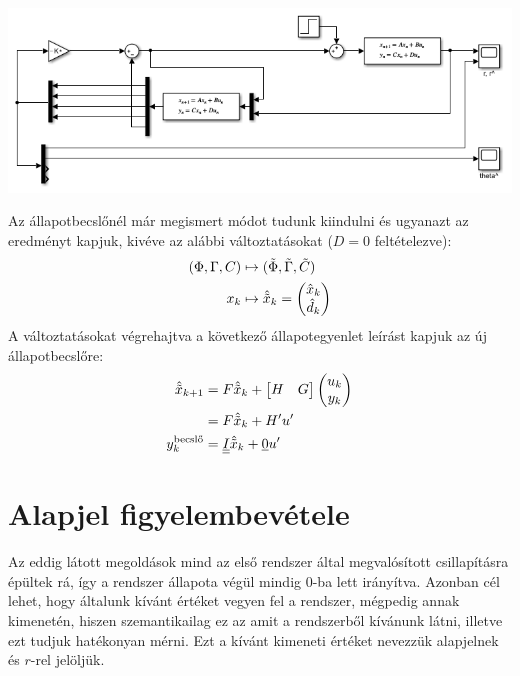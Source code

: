 \documentclass{article}
\begin{document}
        \begin{center}
            \includegraphics[width=\linewidth]{asset/d^.png}
        \end{center}

        Az állapotbecslőnél már megismert módot tudunk kiindulni és ugyanazt az eredményt kapjuk, kivéve az alábbi változtatásokat ($D = 0$ feltételezve):
        \begin{align}
            (\Phi, \Gamma, C) & \mapsto (\tilde{\Phi}, \tilde{\Gamma}, \tilde{C}) \\
            x_k & \mapsto \hat{\tilde{x}}_k = 
            \begin{pmatrix}
                \hat{x}_k \\
                \hat{d}_k
            \end{pmatrix}
        \end{align}
        A változtatásokat végrehajtva a következő állapotegyenlet leírást kapjuk az új állapotbecslőre:
        \begin{align}
            \hat{\tilde{x}}_{k+1} & = F \hat{\tilde{x}}_k +
            \begin{bmatrix}
                H & G
            \end{bmatrix}
            \begin{pmatrix}
                u_k \\
                y_k
            \end{pmatrix} \\
            & = F \hat{\tilde{x}}_k + H'u'
            \\
            y_k^{\textrm{becslő}} & = \underline{\underline{I}} \hat{\tilde{x}}_{k} + \underline{0} u'
        \end{align}

\section{Alapjel figyelembevétele}
    Az eddig látott megoldások mind az első rendszer által megvalósított csillapításra épültek rá, így a rendszer állapota végül mindig 0-ba lett irányítva. Azonban cél lehet, hogy általunk kívánt értéket vegyen fel a rendszer, mégpedig annak kimenetén, hiszen szemantikailag ez az amit a rendszerből kívánunk látni, illetve ezt tudjuk hatékonyan mérni. Ezt a kívánt kimeneti értéket nevezzük alapjelnek és $r$-rel jelöljük.
\end{document}
